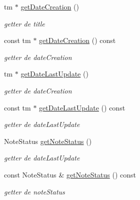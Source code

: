 \begin{DoxyCompactItemize}
\mbox{\label{classNote_a30b86249384892471f698e8bf0c685ec}} 
tm $\ast$ \hyperlink{classNote_a30b86249384892471f698e8bf0c685ec}{get\+Date\+Creation} ()
\begin{DoxyCompactList}\small\item\em getter de title \end{DoxyCompactList}\item 
\mbox{\label{classNote_adc6ce36a76c088f60bfe33befc09e01d}} 
const tm $\ast$ \hyperlink{classNote_adc6ce36a76c088f60bfe33befc09e01d}{get\+Date\+Creation} () const
\begin{DoxyCompactList}\small\item\em getter de date\+Creation \end{DoxyCompactList}\item 
\mbox{\label{classNote_aa54ad72e399cbcf3313725ce5aaec08b}} 
tm $\ast$ \hyperlink{classNote_aa54ad72e399cbcf3313725ce5aaec08b}{get\+Date\+Last\+Update} ()
\begin{DoxyCompactList}\small\item\em getter de date\+Creation \end{DoxyCompactList}\item 
\mbox{\label{classNote_a464f61abdf03be37a2860bc3732c883d}} 
const tm $\ast$ \hyperlink{classNote_a464f61abdf03be37a2860bc3732c883d}{get\+Date\+Last\+Update} () const
\begin{DoxyCompactList}\small\item\em getter de date\+Last\+Update \end{DoxyCompactList}\item 
\mbox{\label{classNote_aff9b6c2cc81a3a302a6544b9dab0ef33}} 
Note\+Status \hyperlink{classNote_aff9b6c2cc81a3a302a6544b9dab0ef33}{get\+Note\+Status} ()
\begin{DoxyCompactList}\small\item\em getter de date\+Last\+Update \end{DoxyCompactList}\item 
\mbox{\label{classNote_ab880a7a12c1832bb0db6ea2ee44cff44}} 
const Note\+Status \& \hyperlink{classNote_ab880a7a12c1832bb0db6ea2ee44cff44}{get\+Note\+Status} () const
\begin{DoxyCompactList}\small\item\em getter de note\+Status \end{DoxyCompactList}\item 

\end{DoxyCompactItemize}
